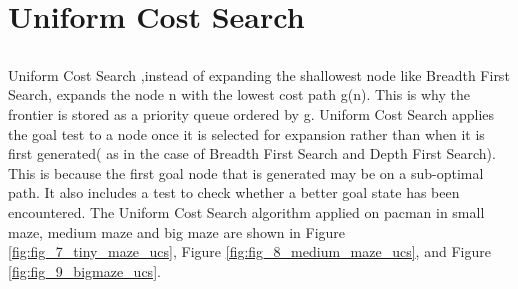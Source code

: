 \documentclass[
10pt, %
a4paper, %
oneside, %
headinclude,footinclude, %
BCOR5mm, %
]{scrartcl}
\begin{document}

\section{\textbf{Uniform Cost Search}}
\subsection*{}
Uniform Cost Search ,instead of expanding the shallowest node like Breadth First Search, expands the node n with the lowest cost path g(n). This is why the frontier is stored as a priority queue ordered by g. Uniform Cost Search applies the goal test to a node once it is selected for expansion rather than when it is first generated( as in the case of Breadth First Search and Depth First Search). This is because the first goal node that is generated may be on a sub-optimal path. It also includes a test to check whether a better goal state has been encountered. The Uniform Cost Search algorithm applied on pacman in small maze, medium maze and big maze are shown in Figure \ref{fig:fig_7_tiny_maze_ucs}, Figure \ref{fig:fig_8_medium_maze_ucs}, and Figure \ref{fig:fig_9_bigmaze_ucs}.
\end{document}
